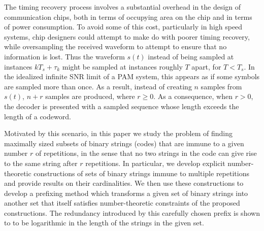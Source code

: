 \documentclass[12pt]{article} \pagestyle{plain} \topmargin
\begin{document}
The timing recovery process involves a substantial overhead in the
design of communication chips, both in terms of occupying area on
the chip and in terms of power consumption. To avoid some of this
cost, particularly in high speed systems, chip designers could
attempt to make do with poorer timing recovery, while oversampling
the received waveform to attempt to ensure that no information is
lost. Thus the waveform $s(t)$ instead of being sampled at
instances $kT_s+\tau_k$ might be sampled at instances roughly $T$
apart, for $T<T_s$. In the idealized infinite SNR limit of a PAM
system, this appears as if some symbols are sampled more than
once. As a result, instead of creating $n$ samples from $s(t)$,
$n+r$ samples are produced, where $r \geq 0$. As a consequence,
when $r>0$, the decoder is presented with a sampled sequence whose
length exceeds the length of a codeword.

Motivated by this scenario, in this paper we study the problem of
finding maximally sized subsets of binary strings (codes) that are
immune to a given number $r$ of repetitions, in the sense that no
two strings in the code can give rise to the same string after $r$
repetitions. In particular, we develop explicit number-theoretic
constructions of sets of binary strings immune to multiple
repetitions and provide results on their cardinalities. We then
use these constructions to develop a prefixing method which
transforms a given set of binary strings into another set that
itself satisfies number-theoretic constraints of the proposed
constructions. The redundancy introduced by this carefully chosen
prefix is shown to to be logarithmic in the length of the strings
in the given set.
\end{document}
